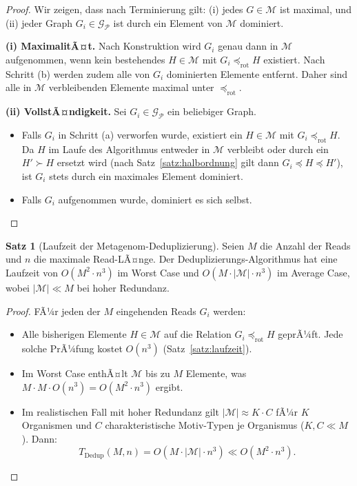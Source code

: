 ﻿\documentclass[a4paper,12pt]{article}
\theoremstyle{definition}
\newtheorem{satz}{Satz}
\begin{document}
\begin{proof}
	Wir zeigen, dass nach Terminierung gilt:
	(i) jedes $G \in \mathcal{M}$ ist maximal, und
	(ii) jeder Graph $G_i \in \mathcal{G}_{\mathcal{P}}$ ist durch ein
	Element von $\mathcal{M}$ dominiert.
	
	\textbf{(i) MaximalitÃ¤t.}
	Nach Konstruktion wird $G_i$ genau dann in $\mathcal{M}$ aufgenommen,
	wenn kein bestehendes $H \in \mathcal{M}$ mit $G_i \preceq_{\mathrm{rot}} H$
	existiert. Nach Schritt (b) werden zudem alle von $G_i$ dominierten
	Elemente entfernt. Daher sind alle in $\mathcal{M}$ verbleibenden Elemente
	maximal unter $\preceq_{\mathrm{rot}}$.
	
	\textbf{(ii) VollstÃ¤ndigkeit.}
	Sei $G_i \in \mathcal{G}_{\mathcal{P}}$ ein beliebiger Graph.
	\begin{itemize}
		\item Falls $G_i$ in Schritt (a) verworfen wurde, existiert ein
		$H \in \mathcal{M}$ mit $G_i \preceq_{\mathrm{rot}} H$.
		Da $H$ im Laufe des Algorithmus entweder in $\mathcal{M}$
		verbleibt oder durch ein $H' \succ H$ ersetzt wird
		(nach Satz~\ref{satz:halbordnung} gilt dann
		$G_i \preceq H \preceq H'$), ist $G_i$ stets durch ein
		maximales Element dominiert.
		\item Falls $G_i$ aufgenommen wurde, dominiert es sich selbst. 
	\end{itemize}
\end{proof}

\begin{satz}[Laufzeit der Metagenom-Deduplizierung]
	\label{satz:dedup_laufzeit}
	Seien $M$ die Anzahl der Reads und $n$ die maximale Read-LÃ¤nge.
	Der Deduplizierungs-Algorithmus hat eine Laufzeit von
	$O(M^2 \cdot n^3)$ im Worst Case und $O(M \cdot |\mathcal{M}| \cdot n^3)$
	im Average Case, wobei $|\mathcal{M}| \ll M$ bei hoher Redundanz.
\end{satz}

\begin{proof}
	FÃ¼r jeden der $M$ eingehenden Reads $G_i$ werden:
	\begin{itemize}
		\item Alle bisherigen Elemente $H \in \mathcal{M}$ auf die Relation
		$G_i \preceq_{\mathrm{rot}} H$ geprÃ¼ft. Jede solche PrÃ¼fung
		kostet $O(n^3)$ (Satz~\ref{satz:laufzeit}).
		\item Im Worst Case enthÃ¤lt $\mathcal{M}$ bis zu $M$ Elemente, was
		$M \cdot M \cdot O(n^3) = O(M^2 \cdot n^3)$ ergibt.
		\item Im realistischen Fall mit hoher Redundanz gilt $|\mathcal{M}|
		\approx K \cdot C$ fÃ¼r $K$ Organismen und $C$ charakteristische
		Motiv-Typen je Organismus ($K, C \ll M$). Dann:
		\[
		T_{\text{Dedup}}(M, n) = O(M \cdot |\mathcal{M}| \cdot n^3)
		\ll O(M^2 \cdot n^3).
		\]
	\end{itemize}
\end{proof}
\end{document}
